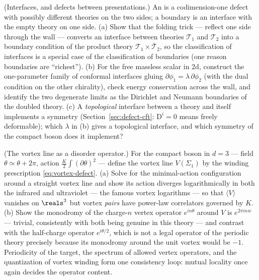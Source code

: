 \begin{exercise}[medium]
\label{exr:interface}
(Interfaces, and defects between presentations.) An 
is a codimension-one defect with possibly different theories on the
two sides; a boundary is an interface with the empty theory on one
side. (a) Show that the
folding trick --- reflect one side through the wall --- converts an
interface between theories $\mathcal T_1$ and $\mathcal T_2$ into a
boundary condition of the product theory $\mathcal T_1 \times
\bar{\mathcal T}_2$, so the classification of interfaces is a special
case of the classification of boundaries (one reason boundaries are
``richest''). (b) For the free massless scalar in 2d, construct the
one-parameter family of conformal interfaces gluing $\partial\phi_1 =
\lambda\, \partial\phi_2$ (with the dual condition on the other
chirality), check energy conservation across the wall, and identify
the two degenerate limits as the Dirichlet and Neumann boundaries of
the doubled theory. (c) A \emph{topological} interface between a
theory and itself implements a symmetry (Section~\ref{sec:defect-cft}:
$\mathrm{D}^i = 0$ means freely deformable); which $\lambda$ in (b)
gives a topological interface, and which symmetry of the compact boson
does it implement?
\end{exercise}

\begin{exercise}[medium]
\label{exr:vortex-defect-ex}
(The vortex line as a disorder operator.) For the compact boson in
$d = 3$ --- field $\theta \simeq \theta + 2\pi$, action
$\frac{K}{2}\int (\partial\theta)^2$ --- define the vortex line
$V(\Sigma_1)$ by the winding prescription \eqref{eq:vortex-defect}.
(a) Solve for the minimal-action configuration around a straight
vortex line and show its action diverges logarithmically in both the
infrared and ultraviolet --- the famous vortex logarithms --- so that
$\langle V \rangle$ vanishes on $\reals^3$ but vortex \emph{pairs}
have power-law correlators governed by $K$. (b) Show the monodromy of
the charge-$n$ vertex operator $e^{in\theta}$ around $V$ is $e^{2\pi i
n w}$ --- trivial, consistently with both being genuine in this
theory --- and contrast with the half-charge operator
$e^{i\theta/2}$, which is not a legal operator of the periodic theory
precisely because its monodromy around the unit vortex would be $-1$.
Periodicity of the target, the spectrum of allowed vertex operators,
and the quantization of vortex winding form one consistency loop:
mutual locality once again decides the operator content.
\end{exercise}

